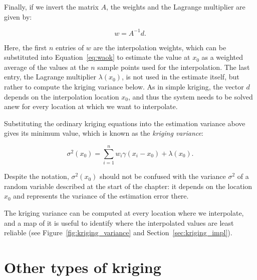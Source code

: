 Finally, if we invert the matrix \(A\), the weights and the Lagrange multiplier are given by:

\begin{equation}
w = A^{-1}d.
\end{equation}

Here, the first \(n\) entries of \(w\) are the interpolation weights, which can be substituted into Equation~\ref{eq:waok} to estimate the value at \(x_0\) as a weighted average of the values at the \(n\) sample points used for the interpolation.
The last entry, the Lagrange multiplier \(\lambda(x_0)\), is not used in the estimate itself, but rather to compute the kriging variance below.
As in simple kriging, the vector \(d\) depends on the interpolation location \(x_0\), and thus the system needs to be solved anew for every location at which we want to interpolate.

Substituting the ordinary kriging equations into the estimation variance above gives its minimum value, which is known as the \emph{kriging variance}:

\begin{equation}
\label{eq:krigingvariance}
\sigma^2(x_0) = \sum_{i=1}^n w_i \gamma(x_i-x_0) + \lambda(x_0).
\end{equation}

Despite the notation, \(\sigma^2(x_0)\) should not be confused with the variance \(\sigma^2\) of a random variable described at the start of the chapter: it depends on the location \(x_0\) and represents the variance of the estimation error there.

The kriging variance can be computed at every location where we interpolate, and a map of it is useful to identify where the interpolated values are least reliable (see Figure~\ref{fig:kriging_variance} and Section~\ref{sec:kriging_impl}).

%
\section{Other types of kriging}%
\label{sec:otherkriging}

